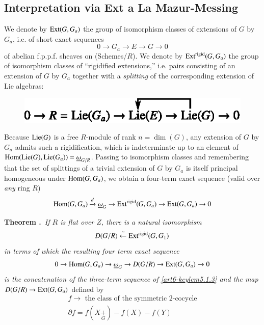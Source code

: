 \subsection{Interpretation via Ext a La Mazur-Messing}\label{art6-sec5.2}
We denote by $\operatorname{Ext}(G,G_{a})$ the group of isomorphism classes of extensions of $G$ by $G_{a}$, i.e. of short exact sequences
$$
0\to G_{a}\to E\to G\to 0
$$
of abelian f.p.p.f. sheaves on (Schemes/$R$). We denote by $\operatorname{Ext}^{\text{rigid}}(G,G_{a})$ the group of isomorphism classes of ``rigidified extensions,'' i.e. pairs consisting of an extension of $G$ by $G_{a}$ together with a {\em splitting} of the corresponding extension of Lie algebras:
\begin{figure}[H]
\centering
\includegraphics[scale=1.05]{chap6/fig6.eps}
\end{figure}
Because $\operatorname{Lie}(G)$ is a free $R$-module of rank $n=\dim (G)$, any extension of $G$ by $G_{a}$ admits such a rigidification, which is indeterminate up to an element of $\operatorname{Hom}(\operatorname{Lie}(G),\operatorname{Lie}(G_{a}))=\underline{\omega}_{G/R}$. Passing to isomorphism classes and remembering that the set of splittings of a trivial extension of $G$ by $G_{a}$ is itself principal homogeneous under $\operatorname{Hom}(G,G_{a})$, we obtain a four-term exact sequence (valid over {\em any} ring $R$)
$$
\operatorname{Hom}(G,G_{a})\xrightarrow{d}\underline{\omega}_{G}\to \operatorname{Ext}^{\text{rigid}}(G,G_{a})\to \operatorname{Ext}(G,G_{a})\to 0
$$


\smallskip
\noindent
{\bf Theorem .\label{art6-thm5.2.1}}~{\em If $R$ is flat over $Z$, there is a natural isomorphism}
$$
D(G/R)\xleftarrow{\sim}\operatorname{Ext}^{\text{rigid}}(G,G_{1})
$$
{\em in terms of which the resulting four term exact sequence}
$$
0\to \operatorname{Hom}(G,G_{a})\to \underline{\omega}_{G}\to D(G/R)\to \operatorname{Ext}(G,G_{a})\to 0
$$
{\em is the concatenation of the three-term sequence of \eqref{art6-keylem5.1.3} and the map} $D(G/R)\to \operatorname{Ext}(G,G_{a})$ defined by
\begin{gather*}
f\to \text{~the class of the symmetric 2-cocycle}\\[3pt]
\partial f=f(X{\displaystyle{\mathop{+}\limits_{G}}})-f(X)-f(Y)
\end{gather*}

